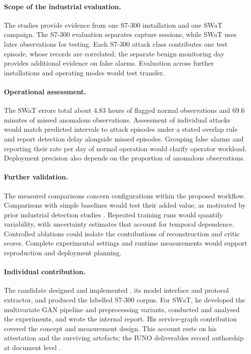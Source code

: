 \paragraph{Scope of the industrial evaluation.}
The studies provide evidence from one S7-300 installation and one SWaT campaign. The S7-300
evaluation separates capture sessions, while SWaT uses later observations for testing. Each
S7-300 attack class contributes one test episode, whose records are correlated; the separate
benign monitoring day provides additional evidence on false alarms. Evaluation across further
installations and operating modes would test transfer.

\paragraph{Operational assessment.}
The SWaT errors total about 4.83 hours of flagged normal observations and 69.6 minutes of missed
anomalous observations. Assessment of individual attacks would match predicted intervals to
attack episodes under a stated overlap rule and report detection delay alongside missed episodes.
Grouping false alarms and reporting their rate per day of normal operation would clarify
operator workload. Deployment precision also depends on the proportion of anomalous observations.

\paragraph{Further validation.}
The measured comparisons concern configurations within the proposed workflow. Comparisons with
simple baselines would test their added value, as motivated by prior industrial detection
studies \cite{wolsing2022simple,bilot2025sometimes}. Repeated training runs would quantify
variability, with uncertainty estimates that account for temporal dependence. Controlled
ablations could isolate the contributions of reconstruction and critic scores. Complete
experimental settings and runtime measurements would support reproduction and deployment planning.

\paragraph{Individual contribution.}
The candidate designed and implemented \nadics{}, its model interface and protocol extractor,
and produced the labelled S7-300 corpus. For SWaT, he developed the multivariate GAN pipeline
and preprocessing variants, conducted and analysed the experiments, and wrote the internal
report. His service-graph contribution covered the concept and measurement design. This account
rests on his attestation and the surviving artefacts; the IUNO deliverables record authorship
at document level \cite{iuno_ap4,iuno_ap7}.

